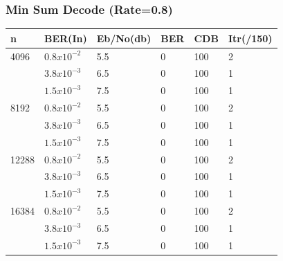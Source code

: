 \documentclass[xcolor=dvipsname]
{beamer}
\begin{document}
\begin{frame}[t] 
\frametitle{Min Sum Decode (Rate=0.8)}
\begin{table}[]
\label{my-label}
\begin{tabular}{|l|l|l|l|l|l|}
\hline
n     & BER(In)  	& Eb/No(db) & BER & CDB & Itr(/150) \\ \hline
4096  &	$0.8x10^{-2}$ & 5.5   & 0   & 100 & 2         \\
      &	$3.8x10^{-3}$ & 6.5   & 0   & 100 & 1         \\ 
      &	$1.5x10^{-3}$ & 7.5   & 0   & 100 & 1         \\ \hline
8192  &	$0.8x10^{-2}$ & 5.5   & 0   & 100 & 2         \\ 
      &	$3.8x10^{-3}$ & 6.5   & 0   & 100 & 1         \\ 
      &	$1.5x10^{-3}$ & 7.5   & 0   & 100 & 1         \\ \hline
12288 &	$0.8x10^{-2}$ & 5.5   & 0   & 100 & 2         \\ 
      &	$3.8x10^{-3}$ & 6.5   & 0   & 100 & 1         \\
      &	$1.5x10^{-3}$ & 7.5   & 0   & 100 & 1         \\ \hline
16384 &	$0.8x10^{-2}$ & 5.5   & 0   & 100 & 2         \\ 
      &	$3.8x10^{-3}$ & 6.5   & 0   & 100 & 1         \\ 
      &	$1.5x10^{-3}$ & 7.5   & 0   & 100 & 1         \\ \hline
\end{tabular}
\end{table}
\end{frame}
\end{document}
